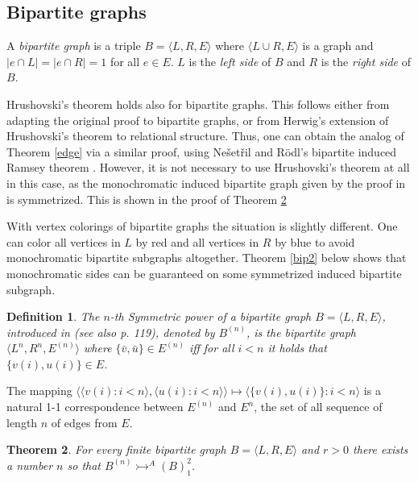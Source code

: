 \documentclass[11pt]{amsart}
\newcommand{\ars}{\rightarrowtail}
\newcommand{\rng}{\rangle}
\newcommand{\lng}{\langle}
\newtheorem{theorem}{Theorem}[section]
\newtheorem{definition}[theorem]{Definition}
\begin{document}
\subsection{Bipartite graphs}



A \emph{bipartite graph} is a triple $B=\lng L,R,E\rng$ where
$\lng L\cup R, E\rng$ is a graph and  $|e\cap L|=|e\cap R|=1$ for
all $e\in E$. $L$ is the \emph{left side} of $B$ and $R$ is the
\emph{ right side} of $B$.

Hrushovski's theorem holds also for bipartite graphs. This follows
either from adapting the original proof to bipartite graphs, or
from Herwig's extension \cite{H} of Hrushovski's theorem to
relational structure. Thus, one can obtain the analog of Theorem
\ref{edge} via a similar proof, using Ne\v set\v ril and R\"
odl's bipartite induced Ramsey theorem \cite{NR76}. However, it
is not necessary to use Hrushovski's theorem at all in this case,
as the monochromatic induced bipartite graph given by the proof
in \cite{NR76} is symmetrized. This is shown in the proof of
Theorem \ref{bip1}

With vertex colorings of bipartite graphs the situation is
slightly different. One can  color all vertices in $L$ by red and
all vertices in $R$ by blue to avoid monochromatic bipartite
subgraphs altogether. Theorem \ref{bip2} below shows that
monochromatic sides can  be guaranteed on some symmetrized induced
bipartite subgraph.

\begin{definition}
  The \emph{$n$-th Symmetric power} of a bipartite graph $B=\lng L,R,
  E\rng$, introduced in \cite{NR76} (see also \cite{GRS} p. 119),  denoted by
  $B^{(n)}$, is the bipartite graph $\lng L^n, R^n, E^{(n)}\rng$ where
  $\{\bar v, \bar u\}\in E^{(n)}$ iff for all $i<n$ it holds that
  $\{v(i),u(i)\}\in E$.
\end{definition}

The mapping $\lng \lng v(i):i<n\rng, \lng u(i):i<n\rng\rng\mapsto
\lng \{v(i),u(i)\}:i<n\rng$ is a natural 1-1 correspondence
between $E^{(n)}$ and $E^n$, the set of all sequence of length
$n$ of edges from $E$.

\begin{theorem}\label{bip1}
  For every finite bipartite graph $B=\lng L, R, E\rng$ and $r>0$
  there exists a number $n$ so that $B^{(n)}\ars^A (B)^2_1$.
\end{theorem}
\end{document}
